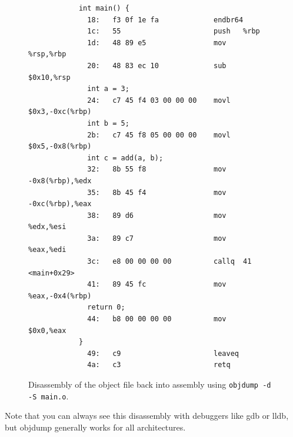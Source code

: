 \documentclass{article}
\begin{document}
\begin{theorem}
\begin{figure}[H]
\begin{lstlisting}
            int main() {
              18:	f3 0f 1e fa          	endbr64 
              1c:	55                   	push   %rbp
              1d:	48 89 e5             	mov    %rsp,%rbp
              20:	48 83 ec 10          	sub    $0x10,%rsp
              int a = 3; 
              24:	c7 45 f4 03 00 00 00 	movl   $0x3,-0xc(%rbp)
              int b = 5; 
              2b:	c7 45 f8 05 00 00 00 	movl   $0x5,-0x8(%rbp)
              int c = add(a, b); 
              32:	8b 55 f8             	mov    -0x8(%rbp),%edx
              35:	8b 45 f4             	mov    -0xc(%rbp),%eax
              38:	89 d6                	mov    %edx,%esi
              3a:	89 c7                	mov    %eax,%edi
              3c:	e8 00 00 00 00       	callq  41 <main+0x29>
              41:	89 45 fc             	mov    %eax,-0x4(%rbp)
              return 0; 
              44:	b8 00 00 00 00       	mov    $0x0,%eax
            }
              49:	c9                   	leaveq 
              4a:	c3                   	retq  
          \end{lstlisting}
          \caption{Disassembly of the object file back into assembly using \texttt{objdump -d -S main.o}.} 
          \label{fig:disassembly_example_intermixed}
        \end{figure}
        Note that you can always see this disassembly with debuggers like gdb or lldb, but objdump generally works for all architectures. 
      \end{theorem}
\end{document}
